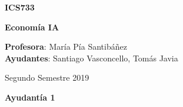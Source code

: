 \documentclass[spanish, 10pt]{article}
\begin{document}
\begin{center}

  \large{\textbf{ICS733}}

  \Large{\noindent \textbf{Economía IA}}

  \large{ \noindent \textbf{Profesora}: María Pía Santibáñez}\\

  \normalsize{\textbf{Ayudantes}: Santiago Vasconcello, Tomás Javia}

  \bigskip
  \bigskip
  \textmd{\large{Segundo Semestre 2019}}

  \bigskip

  \normalsize{\textbf{Ayudantía 1}}

\end{center}
\bigskip
\end{document}
